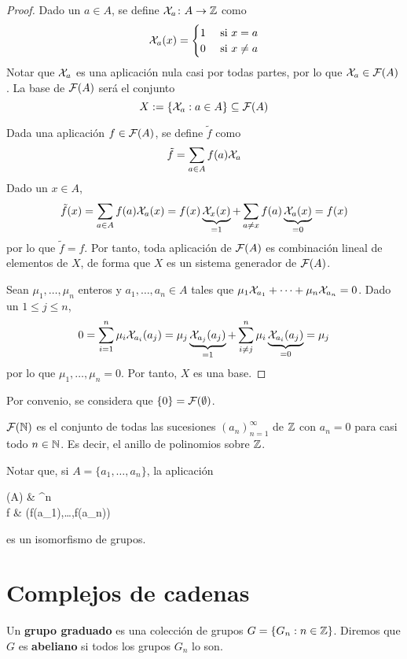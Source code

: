 \begin{proof}
Dado un $a \in A$, se define $\mathcal{X}_a\colon A \to \mathbb{Z}$ como
\[\mathcal{X}_a(x)=\begin{cases}
1&\mbox{ si }x=a\\
0&\mbox{ si }x\neq a
\end{cases}\]
Notar que $\mathcal{X}_a$ es una aplicación nula casi por todas partes, por lo que
$\mathcal{X}_a \in \mathcal{F}(A)$. La base de $\mathcal{F}(A)$ será el conjunto
\[X:=\{\mathcal{X}_a: a\in A\} \subseteq \mathcal{F}(A)\]

Dada una aplicación $f \in \mathcal{F}(A)$, se define $\tilde{f}$ como
\[\tilde{f}=\sum_{a \in A}f(a)\mathcal{X}_a\]
Dado un $x \in A$,
\begin{equation}
\label{tildef}\tilde{f}(x)=\sum_{a \in A} f(a)\mathcal{X}_a(x)=
f(x)\underbrace{\mathcal{X}_x(x)}_{=1}+
\sum_{a \neq x}f(a)\underbrace{\mathcal{X}_a(x)}_{=0}=f(x)
\end{equation}
por lo que $\tilde{f}=f$. Por tanto, toda aplicación de $\mathcal{F}(A)$ es
combinación lineal de elementos de $X$, de forma que $X$ es un sistema generador
de $\mathcal{F}(A)$.

Sean $\mu_1,\dots,\mu_n$ enteros y $a_1,\dots,a_n \in A$ tales que
$\mu_1\mathcal{X}_{a_1}+\dots+\mu_n\mathcal{X}_{a_n}=0$. Dado un $1 \leq j \leq n$,
\[0=\sum^n_{i=1}\mu_i\mathcal{X}_{a_i}(a_j)=
\mu_j\underbrace{\mathcal{X}_{a_j}(a_j)}_{=1}+
\sum^n_{i \neq j}\mu_i\underbrace{\mathcal{X}_{a_i}(a_j)}_{=0}=\mu_j\]
por lo que $\mu_1,\dots,\mu_n=0$. Por tanto, $X$ es una base.
\end{proof}

Por convenio, se considera que $\{0\}=\mathcal{F}(\emptyset)$.

\begin{example}
$\mathcal{F}(\mathbb{N})$ es el conjunto de todas las sucesiones $(a_n)_{n=1}^\infty$
de $\mathbb{Z}$ con $a_n=0$ para casi todo $n \in \mathbb{N}$. Es decir, el anillo de
polinomios sobre $\mathbb{Z}$.
\end{example}

Notar que, si $A=\{a_1,\dots,a_n\}$, la aplicación
\begin{funcion}
\Psi\colon {}(A) \arrow[r]	& ^n\\
f \arrow[maps to,r]			& (f(a_1),\dots,f(a_n))
\end{funcion}
es un isomorfismo de grupos.

\section{Complejos de cadenas}
\begin{definition}
Un \textbf{grupo graduado} es una colección de grupos $G=\{G_n: n \in \mathbb{Z}\}$.
Diremos que $G$ es \textbf{abeliano} si todos los grupos $G_n$ lo son.
\end{definition}

